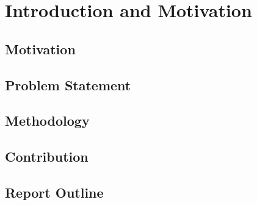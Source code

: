 \chapter{Introduction and Motivation}
\minitoc

\section{Motivation}

\section{Problem Statement}

\section{Methodology}

\section{Contribution}

\section{Report Outline}
